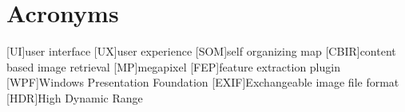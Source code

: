 %
%
%
%
%
%


\chapter*{Acronyms}


\begin{acronym}[TDMA]

[UI]{user interface}
[UX]{user experience}
[SOM]{self organizing map}
[CBIR]{content based image retrieval}
[MP]{megapixel}
[FEP]{feature extraction plugin}
[WPF]{Windows Presentation Foundation}
[EXIF]{Exchangeable image file format}
[HDR]{High Dynamic Range}

\end{acronym}
\vfill

\cleardoublepage